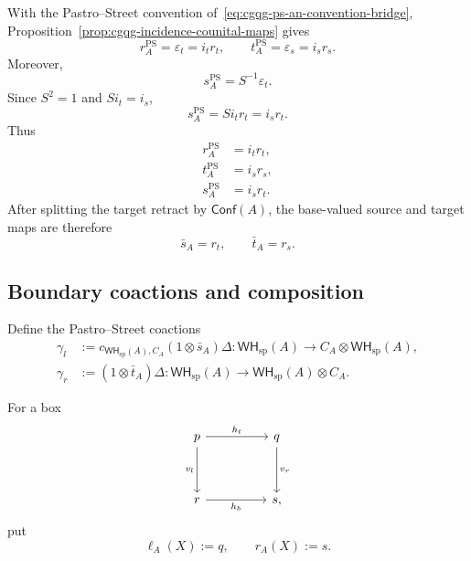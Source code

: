 \documentclass[oneside]{article}
\newcommand{\Conf}{\mathsf{Conf}}
\newcommand{\WH}{\mathsf{WH}}
\theoremstyle{plain}
\theoremstyle{definition}
\theoremstyle{remark}
\begin{document}
With the Pastro--Street convention
of~\eqref{eq:cgqg-ps-an-convention-bridge},
Proposition~\ref{prop:cgqg-incidence-counital-maps} gives
\[
    r_A^{\mathrm{PS}}
    =
    \varepsilon_t
    =
    i_tr_t,
    \qquad
    t_A^{\mathrm{PS}}
    =
    \varepsilon_s
    =
    i_sr_s.
\]
Moreover,
\[
    s_A^{\mathrm{PS}}
    =
    S^{-1}\varepsilon_t.
\]
Since \(S^2=1\) and \(Si_t=i_s\),
\[
    s_A^{\mathrm{PS}}
    =
    S i_tr_t
    =
    i_sr_t.
\]
Thus
\begin{align}
    r_A^{\mathrm{PS}}
    &=
    i_tr_t,
    \\
    t_A^{\mathrm{PS}}
    &=
    i_sr_s,
    \\
    s_A^{\mathrm{PS}}
    &=
    i_sr_t.
\end{align}
After splitting the target retract by \(\Conf(A)\), the base-valued
source and target maps are therefore
\begin{equation}
    \bar s_A=r_t,
    \qquad
    \bar t_A=r_s.
    \label{eq:cgqg-base-valued-source-target}
\end{equation}

\subsection{Boundary coactions and composition}

Define the Pastro--Street coactions
\begin{align}
    \gamma_l
    &:=c_{\WH_{\mathrm{sp}}(A),C_A}(1\otimes\bar s_A)\Delta:
    \WH_{\mathrm{sp}}(A)\longrightarrow C_A\otimes\WH_{\mathrm{sp}}(A),
    \label{eq:cgqg-ps-left-coaction}\\
    \gamma_r
    &:=(1\otimes\bar t_A)\Delta:
    \WH_{\mathrm{sp}}(A)\longrightarrow\WH_{\mathrm{sp}}(A)\otimes C_A.
\label{eq:cgqg-ps-right-coaction}
\end{align}

For a box
\[
    \begin{tikzcd}[column sep=huge,row sep=huge]
         p\arrow[r,"h_t"]\arrow[d,"v_l"']
         &q\arrow[d,"v_r"]\\
         r\arrow[r,"h_b"']&s,
    \end{tikzcd}
\]
put
\begin{equation}
    \ell_A(X):=q,
    \qquad
    r_A(X):=s.
\label{eq:cgqg-box-boundary-functions}
\end{equation}
\end{document}
